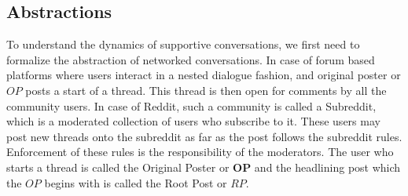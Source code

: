 

\subsection{Abstractions}
\label{Sec:Abstractions}
To understand the dynamics of supportive conversations, we first need to formalize the abstraction of networked conversations. In case of forum based platforms where users interact in a nested dialogue fashion, and original poster or $OP$ posts a start of a thread. This thread is then open for comments by all the community users. In case of Reddit, such a community is called a Subreddit, which is a moderated collection of users who subscribe to it. These users may post new threads onto the subreddit as far as the post follows the subreddit rules. Enforcement of these rules is the responsibility of the moderators. The user who starts a thread is called the Original Poster or \textbf{OP} and the headlining post which the $OP$ begins with is called the Root Post or $RP$. 


\label{Sec:network}

